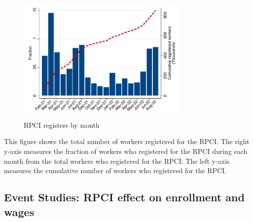 \documentclass[oneside,11pt]{article}
\begin{document}
\begin{figure}[H]
    \caption{RPCI registers by month}
    \label{hist_download}
    \begin{center}
    \includegraphics[width=0.75\textwidth]{04_Figures/muestra_1porciento/hist_download_month.pdf}
    \end{center}
\end{figure}
\scriptsize{
\noindent This figure shows the total number of workers registered for the RPCI. The right y-axis measures the fraction of workers who registered for the RPCI during each month from the total workers who registered for the RPCI. The left y-axis measures the cumulative number of workers who registered for the RPCI.
}

\clearpage

\subsection{Event Studies: RPCI effect on enrollment and wages}
\end{document}
